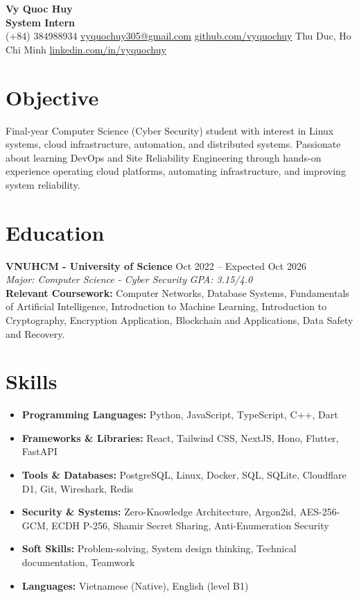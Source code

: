 \documentclass[10pt,a4paper]{article}
\begin{document}
\pagestyle{empty}

\begin{center}
    {\huge \textbf{Vy Quoc Huy}} \\ \vspace{4pt}
    {\Large \textbf{System Intern}} \\ \vspace{4pt}
    (+84) 384988934 \quad \href{mailto:vyquochuy305@gmail.com}{vyquochuy305@gmail.com} \quad \href{https://github.com/vyquochuy}{github.com/vyquochuy} \quad Thu Duc, Ho Chi Minh \quad \href{https://www.linkedin.com/in/vyquochuy/}{linkedin.com/in/vyquochuy}
\end{center}

\section*{Objective}
Final-year Computer Science (Cyber Security) student with interest in Linux systems, cloud infrastructure, automation, and distributed systems. Passionate about learning DevOps and Site Reliability Engineering through hands-on experience operating cloud platforms, automating infrastructure, and improving system reliability.

\section*{Education}
\noindent \textbf{VNUHCM - University of Science} \hfill Oct 2022 -- Expected Oct 2026\\
\textit{Major: Computer Science - Cyber Security} \hfill \textit{GPA: 3.15/4.0}\\
\textbf{Relevant Coursework:} Computer Networks, Database Systems, Fundamentals of Artificial Intelligence, Introduction to Machine Learning, Introduction to Cryptography, Encryption Application, Blockchain and Applications, Data Safety and Recovery.

\section*{Skills}
\begin{itemize}[leftmargin=0.15in, label={}, itemsep=0pt]
    \item \textbf{Programming Languages:} Python, JavaScript, TypeScript, C++, Dart
    \item \textbf{Frameworks \& Libraries:} React, Tailwind CSS, NextJS, Hono, Flutter, FastAPI
    \item \textbf{Tools \& Databases:} PostgreSQL, Linux, Docker, SQL, SQLite, Cloudflare D1, Git, Wireshark, Redis
    \item \textbf{Security \& Systems:} Zero-Knowledge Architecture, Argon2id, AES-256-GCM, ECDH P-256, Shamir Secret Sharing, Anti-Enumeration Security
    \item \textbf{Soft Skills:} Problem-solving, System design thinking, Technical documentation, Teamwork
    \item \textbf{Languages:} Vietnamese (Native), English (level B1)
\end{itemize}
\end{document}
